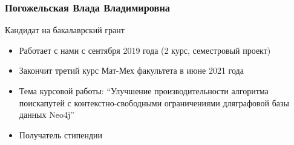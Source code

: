 \documentclass[xcolor=table,aspectratio=169]{beamer}
\begin{document}
\begin{frame}[fragile] \frametitle{Погожельская Влада Владимировна}
      \begin{minipage}[m]{0.45\linewidth}
  \end{minipage}\hfill
  \begin{minipage}[m]{0.54\linewidth}
  \vspace{-2cm}
  Кандидат на бакалаврский грант

  \begin{itemize}
        \item Работает с нами с сентября 2019 года (2 курс, семестровый проект)
        \item Закончит третий курс Мат-Мех факультета в июне 2021 года
        \item Тема курсовой работы: ``Улучшение производительности алгоритма поискапутей с контекстно-свободными ограничениями дляграфовой базы данных Neo4j''
        \item Получатель стипендии        
  \end{itemize}
  \end{minipage}

\end{frame}
\end{document}
